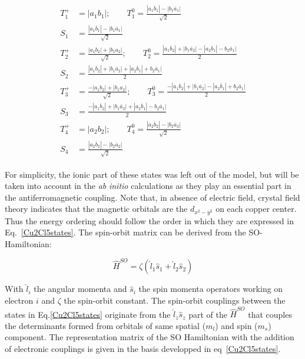 \documentclass[12pt,a4paper]{report}
\numberwithin{equation}{section}
\begin{document}
\begin{align}
    \begin{split}
    T_1^+&=|a_1b_1| ; \qquad T_1^0= \frac{|a_1 \overline{b}_1|-|b_1\overline{a}_1|}{\sqrt{2}}\\
    S_1&=\frac{|a_1 \overline{b}_1|-|b_1\overline{a}_1|}{\sqrt{2}}\\
    T_2^+&=\frac{|a_1b_2|+|b_1a_2|}{\sqrt{2}} ;\qquad T_2^0=\frac{|a_1\overline{b}_2|+|b_1\overline{a}_2|-|a_2\overline{b}_1|-b_2\overline{a}_1|}{2}\\
    S_2&=\frac{|a_1\overline{b}_2|+|b_1\overline{a}_2|+|a_2\overline{b}_1|+b_2\overline{a}_1|}{2}\\
    T_3^+&=\frac{-|a_1b_2|+|b_1a_2|}{\sqrt{2}} ;\qquad T_3^0=\frac{-|a_1\overline{b}_2|+|b_1\overline{a}_2|-|a_2\overline{b}_1|+b_2\overline{a}_1|}{2}\\
    S_3&=\frac{-|a_1\overline{b}_2|+|b_1\overline{a}_2|+|a_2\overline{b}_1|-b_2\overline{a}_1|}{2}\\
    T_4^+&=|a_2b_2| ; \qquad T_4^0= \frac{|a_2 \overline{b}_2|-|b_2\overline{a}_2|}{\sqrt{2}}\\
    S_4&=\frac{|a_2 \overline{b}_2|-|b_2\overline{a}_2|}{\sqrt{2}} 
    \end{split}
    \label{Cu2Cl5states}
\end{align}

For simplicity, the ionic part of these states was left out of the model, but will be taken into account in the \textit{ab} \textit{initio} calculations as they play an essential part in the antiferromagnetic coupling.
Note that, in absence of electric field, crystal field theory indicates that the magnetic orbitals are the $d_{x^2-y^2}$ on each copper center. Thus the energy ordering should follow the order in which they are expressed in Eq.~\ref{Cu2Cl5states}.
The spin-orbit matrix can be derived from the SO-Hamiltonian:

\begin{equation}
    \hat{H}^{SO}=\zeta (\hat{l}_1 \hat{s}_1 +\hat{l}_2\hat{s}_2)
\end{equation}

With $\hat{l}_i$ the angular momenta and $\hat{s}_i$ the spin momenta operators working on electron $i$ and $\zeta$ the spin-orbit constant.
The spin-orbit couplings between the states in Eq.\ref{Cu2Cl5states} originate from the $\hat{l}_z\hat{s}_z$ part of the $\hat{H}^{SO}$ that couples the determinants formed from orbitals of same spatial ($m_l$) and spin ($m_s$) component.
The representation matrix of the SO Hamiltonian with the addition of electronic couplings is given in the basis developped in eq~\ref{Cu2Cl5states}.
\end{document}
